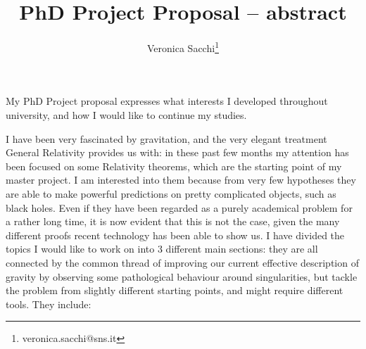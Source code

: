 \documentclass[12pt, a4paper]{article}
\title{PhD Project Proposal -- abstract}
\author{Veronica Sacchi\thanks{veronica.sacchi@sns.it}}
\begin{document}
\maketitle

My PhD Project proposal expresses what interests I developed throughout university, and how I would like to continue my studies. 

I have been very fascinated by gravitation, and the very elegant treatment General Relativity provides us with: in these past few months my attention has been focused on some Relativity theorems, which are the starting point of my master project. 
I am interested into them because from very few hypotheses they are able to make powerful predictions  on pretty complicated objects, such as black holes. Even if they have been regarded as a purely academical problem for a rather long time, it is now evident that this is not the case, given the many different proofs recent technology has been able to show us.
I have divided the topics I would like to work on into \(3\) different main sections: they are all connected by the common thread of improving our current effective description of gravity by observing some pathological behaviour around singularities, but tackle the problem from slightly different starting points, and might require different tools. They include:
\end{document}
